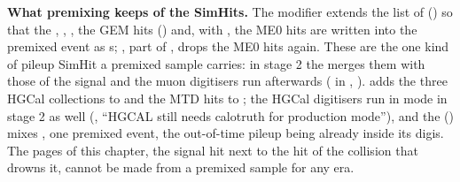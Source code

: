\textbf{What premixing keeps of the SimHits.} The modifier  extends the list
 of  () so that the
, , , the GEM hits () and, with
, the ME0 hits are written into the premixed event as s; ,
part of , drops the ME0 hits again. These are the one kind of pileup SimHit a premixed sample
carries: in stage 2 the  merges them with those of the signal and the muon digitisers run
afterwards ( in , ).
 adds the three HGCal collections to  and  the
MTD hits to ; the HGCal digitisers run in  mode in stage 2 as well
(, ``HGCAL still needs calotruth for production mode''),
and the  () mixes
, one premixed event, the out-of-time pileup being already inside its digis. The
pages of this chapter, the signal hit next to the hit of the collision that drowns it, cannot be made from a
premixed sample for any era.
